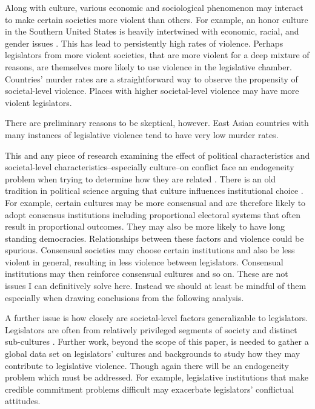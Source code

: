 \documentclass[a4paper]{article}\usepackage[]{graphicx}\usepackage[]{color}
\begin{document}
Along with culture, various economic and sociological phenomenon may interact to make certain societies more violent than others. For example, an honor culture in the Southern United States is heavily intertwined with economic, racial, and gender issues \citep[see]{nisbett1996culture}. This has lead to persistently high rates of violence. Perhaps legislators from more violent societies, that are more violent for a deep mixture of reasons, are themselves more likely to use violence in the legislative chamber. Countries' murder rates are a straightforward way to observe the propensity of societal-level violence. Places with higher societal-level violence may have more violent legislators. 

There are preliminary reasons to be skeptical, however. East Asian countries with many instances of legislative violence tend to have very low murder rates.

This and any piece of research examining the effect of political characteristics and societal-level characteristics--especially culture--on conflict face an endogeneity problem when trying to determine how they are related \citep[][751]{Carey2000}. There is an old tradition in political science \citep[][528--529]{Frye1997} arguing that culture influences institutional choice \citep[in particular see][]{Almond1963}. For example, certain cultures may be more consensual and are therefore likely to adopt consensus institutions \citep[][22-23]{Lijphart2003} including proportional electoral systems that often result in proportional outcomes. They may also be more likely to have long standing democracies. Relationships between these factors and violence could be spurious. Consensual societies may choose certain institutions and also be less violent in general, resulting in less violence between legislators. Consensual institutions may then reinforce consensual cultures and so on. These are not issues I can definitively solve here. Instead we should at least be mindful of them especially when drawing conclusions from the following analysis.

A further issue is how closely are societal-level factors generalizable to legislators. Legislators are often from relatively privileged segments of society and distinct sub-cultures \citep[408]{Spary2013}. Further work, beyond the scope of this paper, is needed to gather a global data set on legislators' cultures and backgrounds to study how they may contribute to legislative violence. Though again there will be an endogeneity problem which must be addressed. For example, legislative institutions that make credible commitment problems difficult may exacerbate legislators' conflictual attitudes.   
\end{document}

